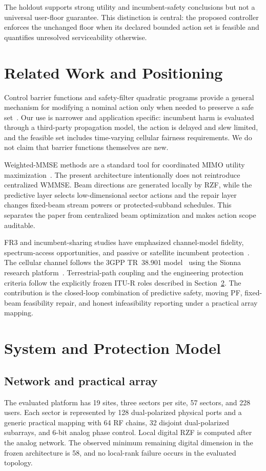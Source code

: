 \documentclass[journal]{IEEEtran}
\begin{document}
The holdout supports strong utility and incumbent-safety conclusions but not a universal user-floor guarantee. This distinction is central: the proposed controller enforces the unchanged floor when its declared bounded action set is feasible and quantifies unresolved serviceability otherwise.

\section{Related Work and Positioning}
Control barrier functions and safety-filter quadratic programs provide a general mechanism for modifying a nominal action only when needed to preserve a safe set~\cite{ames2017cbf,agrawal2017dcbf,jankovic2018robust}. Our use is narrower and application specific: incumbent harm is evaluated through a third-party propagation model, the action is delayed and slew limited, and the feasible set includes time-varying cellular fairness requirements. We do not claim that barrier functions themselves are new.

Weighted-MMSE methods are a standard tool for coordinated MIMO utility maximization~\cite{shi2011wmmse}. The present architecture intentionally does not reintroduce centralized WMMSE. Beam directions are generated locally by RZF, while the predictive layer selects low-dimensional sector actions and the repair layer changes fixed-beam stream powers or protected-subband schedules. This separates the paper from centralized beam optimization and makes action scope auditable.

FR3 and incumbent-sharing studies have emphasized channel-model fidelity, spectrum-access opportunities, and passive or satellite incumbent protection~\cite{kang2024upper,chamberlain2024sharing}. The cellular channel follows the 3GPP TR~38.901 model~\cite{3gpp38901} using the Sionna research platform~\cite{hoydis2022sionna}. Terrestrial-path coupling and the engineering protection criteria follow the explicitly frozen ITU-R roles described in Section~\ref{sec:model}. The contribution is the closed-loop combination of predictive safety, moving PF, fixed-beam feasibility repair, and honest infeasibility reporting under a practical array mapping.

\section{System and Protection Model}
\label{sec:model}
\subsection{Network and practical array}
The evaluated platform has 19 sites, three sectors per site, 57 sectors, and 228 users. Each sector is represented by 128 dual-polarized physical ports and a generic practical mapping with 64 RF chains, 32 disjoint dual-polarized subarrays, and 6-bit analog phase control. Local digital RZF is computed after the analog network. The observed minimum remaining digital dimension in the frozen architecture is 58, and no local-rank failure occurs in the evaluated topology.
\end{document}
